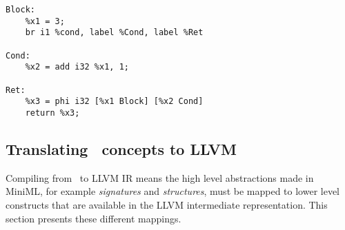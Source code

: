 \begin{description}
\begin{lstlisting}[label=lst:ssaphi, caption={Code in SSA form with function.}, frame=single, language={[x86masm]Assembler}]
Block:
    %x1 = 3;
    br i1 %cond, label %Cond, label %Ret

Cond:
    %x2 = add i32 %x1, 1;
    
Ret:
    %x3 = phi i32 [%x1 Block] [%x2 Cond]
    return %x3;
\end{lstlisting}


\end{description}

\subsection{Translating \MiniML\ concepts to LLVM}
\label{sec:translation}
Compiling from \MiniML\ to LLVM IR means the high level abstractions made in \mbox{MiniML}, for example \emph{signatures} and \emph{structures}, must be mapped to lower level constructs that are available in the LLVM intermediate representation.
This section presents these different mappings.

